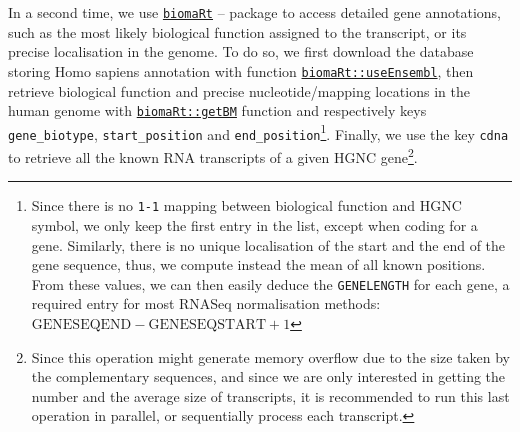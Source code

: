 \begin{Shaded}
\begin{Highlighting}[]
\OtherTok{\textless{}{-}}\SpecialCharTok{::}
                                      \NormalTok{(}\NormalTok{,}\NormalTok{), }\NormalTok{) }\SpecialCharTok{\%\textgreater{}\%}
\SpecialCharTok{::}\NormalTok{(}\NormalTok{(}\NormalTok{))}

\OtherTok{\textless{}{-}}\SpecialCharTok{\%\textgreater{}\%}
\SpecialCharTok{::}\NormalTok{) }\SpecialCharTok{\%\textgreater{}\%}
\SpecialCharTok{::}\NormalTok{(}
\end{Highlighting}
\end{Shaded}

In a second time, we use \href{NA}{\texttt{biomaRt}} \autocite{biomaRt2005}--\autocite{R-biomaRt} package to access detailed gene annotations, such as the most likely biological function assigned to the transcript, or its precise localisation in the genome. To do so, we first download the database storing Homo sapiens annotation with function \href{https://rdrr.io/pkg/biomaRt/man/useEnsembl.html}{\texttt{biomaRt::useEnsembl}}, then retrieve biological function and precise nucleotide/mapping locations in the human genome with \href{https://rdrr.io/pkg/biomaRt/man/getBM.html}{\texttt{biomaRt::getBM}} function and respectively keys \texttt{gene\_biotype}, \texttt{start\_position} and \texttt{end\_position}\footnote{Since there is no \texttt{1-1} mapping between biological function and HGNC symbol, we only keep the first entry in the list, except when coding for a gene. Similarly, there is no unique localisation of the start and the end of the gene sequence, thus, we compute instead the mean of all known positions. From these values, we can then easily deduce the \texttt{GENELENGTH} for each gene, a required entry for most RNASeq normalisation methods: \(\text{GENESEQEND} - \text{GENESEQSTART} + 1\)}. Finally, we use the key \texttt{cdna} to retrieve all the known RNA transcripts of a given HGNC gene\footnote{Since this operation might generate memory overflow due to the size taken by the complementary sequences, and since we are only interested in getting the number and the average size of transcripts, it is recommended to run this last operation in parallel, or sequentially process each transcript.}.

